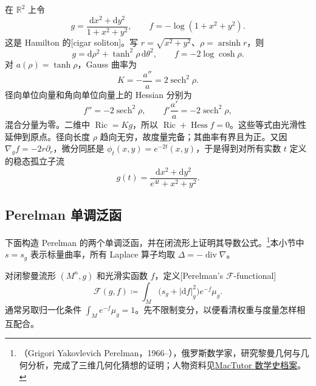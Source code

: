 \begin{example}\label{g3:exm:cigar-ricci-soliton}
	在 \(\mathbb R^2\) 上令
	\[
		g=\frac{\mathrm dx^2+\mathrm dy^2}{1+x^2+y^2},
		\qquad f=-\log(1+x^2+y^2).
	\]
	这是 Hamilton 的[cigar soliton]。写 \(r=\sqrt{x^2+y^2}\)、\(\rho=\operatorname{arsinh}r\)，则
	\[
		g=\mathrm d\rho^2+\tanh^2\rho\,\mathrm d\theta^2,
		\qquad f=-2\log\cosh\rho.
	\]
	对 \(a(\rho)=\tanh\rho\)，Gauss 曲率为
	\[
		K=-\frac{a''}{a}=2\operatorname{sech}^2\rho.
	\]
	径向单位向量和角向单位向量上的 Hessian 分别为
	\[
		f''=-2\operatorname{sech}^2\rho,
		\qquad f'\frac{a'}a=-2\operatorname{sech}^2\rho,
	\]
	混合分量为零。二维中 \(\operatorname{Ric}=Kg\)，所以 \(\operatorname{Ric}+\operatorname{Hess}f=0\)。这些等式由光滑性延伸到原点。径向长度 \(\rho\) 趋向无穷，故度量完备；其曲率有界且为正。又因 \(\nabla_gf=-2r\partial_r\)，微分同胚是 \(\phi_t(x,y)=e^{-2t}(x,y)\)，于是得到对所有实数 \(t\) 定义的稳态孤立子流
	\[
		g(t)=\frac{\mathrm dx^2+\mathrm dy^2}{e^{4t}+x^2+y^2}.
	\]
\end{example}

\subsection{Perelman 单调泛函}
\label{g3:subsec:2704:03}
下面构造 Perelman 的两个单调泛函，并在闭流形上证明其导数公式。\footnote{（Grigori Yakovlevich Perelman，1966--），俄罗斯数学家，研究黎曼几何与几何分析，完成了三维几何化猜想的证明；人物资料见\href{https://mathshistory.st-andrews.ac.uk/Biographies/Perelman/}{MacTutor 数学史档案}。}本小节中 \(s=s_g\) 表示标量曲率，所有 Laplace 算子均取 \(\Delta=-\operatorname{div}\nabla\)。

\ProseParagraphBreak
对闭黎曼流形 \((M^n,g)\) 和光滑实函数 \(f\)，定义[Perelman's \(\mathcal F\)-functional]
\begin{equation}\label{g3:eq:perelman-F-definition}
	\mathcal F(g,f)\coloneqq\int_M\bigl(s_g+|\mathrm df|_g^2\bigr)e^{-f}\mu_g.
\end{equation}
通常另取归一化条件 \(\int_Me^{-f}\mu_g=1\)。先不限制变分，以便看清权重与度量怎样相互配合。


